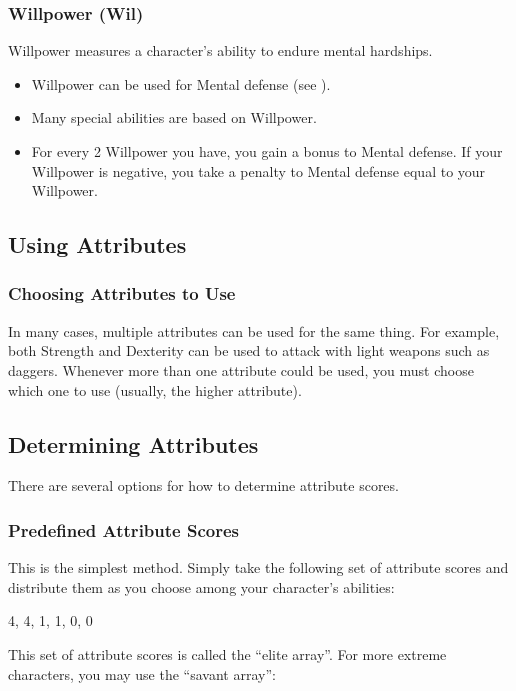         \subsubsection{Willpower (Wil)}\label{Willpower}
            Willpower measures a character's ability to endure mental hardships.
            \begin{itemize}
                \item Willpower can be used for Mental defense (see ).
                \item Many special abilities are based on Willpower.
                \item For every 2 Willpower you have, you gain a  bonus to Mental defense. If your Willpower is negative, you take a penalty to Mental defense equal to your Willpower.
            \end{itemize}

    \subsection{Using Attributes}

        \subsubsection{Choosing Attributes to Use}
            In many cases, multiple attributes can be used for the same thing.
            For example, both Strength and Dexterity can be used to attack with light weapons such as daggers.
            Whenever more than one attribute could be used, you must choose which one to use (usually, the higher attribute).

    \subsection{Determining Attributes}
        There are several options for how to determine attribute scores.

        \subsubsection{Predefined Attribute Scores}
            This is the simplest method.
            Simply take the following set of attribute scores and distribute them as you choose among your character's abilities:

            4, 4, 1, 1, 0, 0

            This set of attribute scores is called the ``elite array''.
            For more extreme characters, you may use the ``savant array'':

